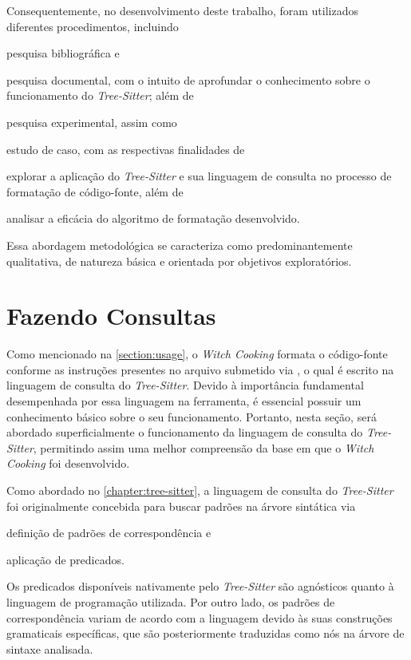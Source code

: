 \documentclass
  [11pt,a4paper,english,brazil,openright,sumario=tradicional,twoside]
  {abntex2}
\newcommand{\treesitter}{\textit{Tree-Sitter}\xspace}
\newcommand{\witchcooking}{\textit{Witch Cooking}\xspace}
\begin{document}
  Consequentemente, no desenvolvimento deste trabalho, foram utilizados
  diferentes procedimentos, incluindo
  \begin{inparaenum}
    \item pesquisa bibliográfica e
    \item pesquisa documental, com o intuito de aprofundar o conhecimento sobre
          o funcionamento do \treesitter; além de
    \item pesquisa experimental, assim como
    \item estudo de caso, com as respectivas finalidades de
          \begin{inparaenum}
            \item explorar a aplicação do \treesitter e sua linguagem de
                  consulta no processo de formatação de código-fonte, além de
            \item analisar a eficácia do algoritmo de formatação desenvolvido.
          \end{inparaenum}
  \end{inparaenum}
  Essa abordagem metodológica se caracteriza como predominantemente
  qualitativa, de natureza básica e orientada por objetivos exploratórios.

  \section{Fazendo Consultas}

  Como mencionado na \cref{section:usage}, o \witchcooking formata o
  código-fonte conforme as instruções presentes no arquivo submetido via
  , o qual é escrito na linguagem de consulta do
  \treesitter. Devido à importância fundamental desempenhada por essa linguagem
  na ferramenta, é essencial possuir um conhecimento básico sobre o seu
  funcionamento. Portanto, nesta seção, será abordado superficialmente o
  funcionamento da linguagem de consulta do \treesitter, permitindo assim uma
  melhor compreensão da base em que o \witchcooking foi desenvolvido.

  Como abordado no \cref{chapter:tree-sitter}, a linguagem de consulta do
  \treesitter foi originalmente concebida para buscar padrões na árvore
  sintática via
  \begin{inparaenum}
    \item definição de padrões de correspondência e
    \item aplicação de predicados.
  \end{inparaenum}
  Os predicados disponíveis nativamente pelo \treesitter são agnósticos quanto
  à linguagem de programação utilizada. Por outro lado, os padrões de
  correspondência variam de acordo com a linguagem devido às suas construções
  gramaticais específicas, que são posteriormente traduzidas como nós na árvore
  de sintaxe analisada.
\end{document}
